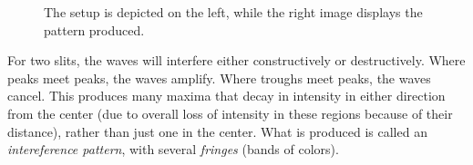 \begin{figure}[h!]
	\centering
	\hspace{1cm}
	\caption*{The setup is depicted on the left, while the right image displays the pattern produced.}
\end{figure}

For two slits, the waves will interfere either constructively or destructively. Where peaks meet peaks, the waves amplify. Where troughs meet peaks, the waves cancel. This produces many maxima that decay in intensity in either direction from the center (due to overall loss of intensity in these regions because of their distance), rather than just one in the center. What is produced is called an \emph{intereference pattern}, with several \emph{fringes} (bands of colors).

